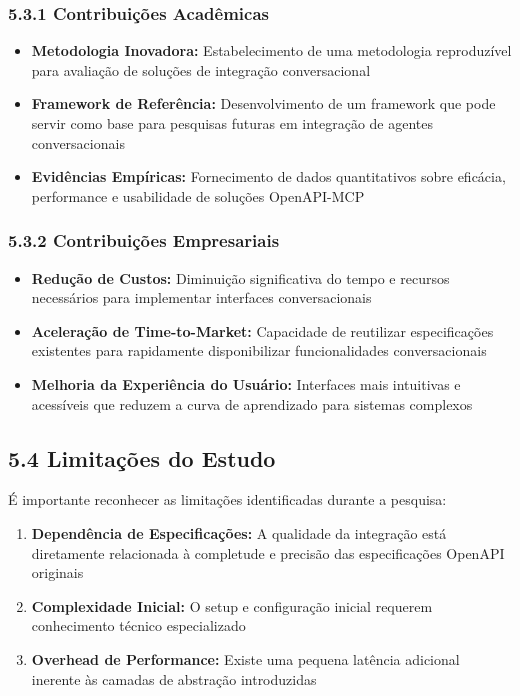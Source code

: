 \documentclass[
]{article}
\providecommand{\tightlist}{%
  \setlength{\itemsep}{0pt}\setlength{\parskip}{0pt}}
\begin{document}
\subsubsection{5.3.1 Contribuições
Acadêmicas}\label{contribuiuxe7uxf5es-acaduxeamicas}

\begin{itemize}
\tightlist
\item
  \textbf{Metodologia Inovadora:} Estabelecimento de uma metodologia
  reproduzível para avaliação de soluções de integração conversacional
\item
  \textbf{Framework de Referência:} Desenvolvimento de um framework que
  pode servir como base para pesquisas futuras em integração de agentes
  conversacionais
\item
  \textbf{Evidências Empíricas:} Fornecimento de dados quantitativos
  sobre eficácia, performance e usabilidade de soluções OpenAPI-MCP
\end{itemize}

\subsubsection{5.3.2 Contribuições
Empresariais}\label{contribuiuxe7uxf5es-empresariais}

\begin{itemize}
\tightlist
\item
  \textbf{Redução de Custos:} Diminuição significativa do tempo e
  recursos necessários para implementar interfaces conversacionais
\item
  \textbf{Aceleração de Time-to-Market:} Capacidade de reutilizar
  especificações existentes para rapidamente disponibilizar
  funcionalidades conversacionais
\item
  \textbf{Melhoria da Experiência do Usuário:} Interfaces mais
  intuitivas e acessíveis que reduzem a curva de aprendizado para
  sistemas complexos
\end{itemize}

\subsection{5.4 Limitações do Estudo}\label{limitauxe7uxf5es-do-estudo}

É importante reconhecer as limitações identificadas durante a pesquisa:

\begin{enumerate}
\def\labelenumi{\arabic{enumi}.}
\tightlist
\item
  \textbf{Dependência de Especificações:} A qualidade da integração está
  diretamente relacionada à completude e precisão das especificações
  OpenAPI originais
\item
  \textbf{Complexidade Inicial:} O setup e configuração inicial requerem
  conhecimento técnico especializado
\item
  \textbf{Overhead de Performance:} Existe uma pequena latência
  adicional inerente às camadas de abstração introduzidas
\end{enumerate}
\end{document}
